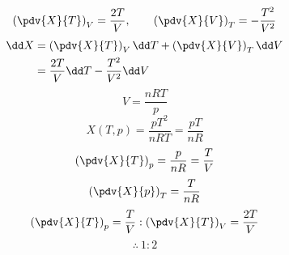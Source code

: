 \[ \left(\pdv{X}{T}\right)_{V}=\frac{2T}{V}, \qquad \left(\pdv{X}{V}\right)_{T}=-\frac{T^{2}}{V^{2}} \]
\begin{align*}
\dd X&=\left(\pdv{X}{T}\right)_{V}\dd T+\left(\pdv{X}{V}\right)_{T}\dd V\\
&=\frac{2T}{V}\dd T-\frac{T^{2}}{V^{2}}\dd V
\end{align*}
\[ V=\frac{nRT}{p} \]
\[ X(T,p)=\frac{pT^{2}}{nRT}=\frac{pT}{nR} \]
\[ \left(\pdv{X}{T}\right)_{p}=\frac{p}{nR}=\frac{T}{V} \]
\[ \left(\pdv{X}{p}\right)_{T}=\frac{T}{nR} \]
\[ \left(\pdv{X}{T}\right)_{p}=\frac{T}{V} : \left(\pdv{X}{T}\right)_{V}=\frac{2T}{V} \]
\[ \therefore\ 1:2 \]
